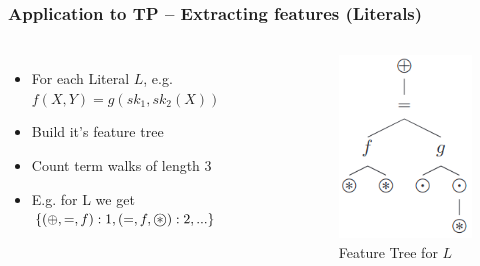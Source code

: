 \documentclass{beamer}
\newcommand\oast{\stackMath\mathbin{\stackinset{c}{0ex}{c}{0ex}{\ast}{\bigcirc}}}
\begin{document}
\begin{frame}
    \frametitle{Application to TP -- Extracting features (Literals)}
    \begin{columns}
    \begin{itemize}
        \item For each Literal $L$, e.g. $f(X, Y) = g(sk_1, sk_2(X))$
        \item Build it's feature tree
        \item Count term walks of length 3
        \item E.g. for L we get {\small$\{(\oplus, =, f): 1, (=, f, \oast):2, ...\}$}
    \end{itemize}
    \begin{figure}
    \includegraphics[width=\textwidth]{AST.png}
    \caption{Feature Tree for $L$}
    \end{figure}
    \end{columns}

\end{frame}
\end{document}
